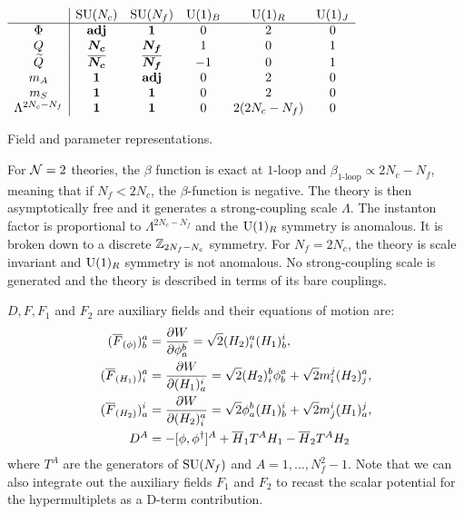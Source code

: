     \begin{table}[H]
        \centering
        $
        \begin{array}{c|ccccc}
            & \text{SU}(N_c) & \text{SU}(N_f) & \text{U}(1)_B & \text{U}(1)_R & \text{U}(1)_J \\ \hline
            \Phi & \textbf{adj} & \boldsymbol{1} & 0 & 2 & 0 \\
            Q & \boldsymbol{N_c} & \boldsymbol{N_f} & 1 & 0 & 1 \\
            \widetilde{Q} & \overline{\boldsymbol{N_c}} & \overline{\boldsymbol{N_f}} & -1 & 0 & 1 \\
            m_A & \boldsymbol{1} & \textbf{adj} & 0 & 2 & 0 \\
            m_S & \boldsymbol{1} & \boldsymbol{1} & 0 & 2 & 0 \\
            \Lambda^{2N_c-N_f} & \boldsymbol{1} & \boldsymbol{1} & 0 & 2(2N_c-N_f) & 0
        \end{array}
        $
        \caption{Field and parameter representations.}
        \label{table:fieldrepr}
    \end{table}

    For $\mathcal{N}=2$ theories, the $\beta$ function is exact at $1$-loop and $\beta_{1\text{-loop}}\propto 2N_c-N_f$, meaning that if $N_f<2N_c$, the $\beta$-function is negative. The theory is then asymptotically free and it generates a strong-coupling scale $\Lambda$. The instanton factor is proportional to $\Lambda^{2N_c-N_f}$ and the $\text{U}(1)_R$ symmetry is anomalous. It is broken down to a discrete $\mathbb{Z}_{2N_f-N_c}$ symmetry. For $N_f=2N_c$, the theory is scale invariant and $\text{U}(1)_R$ symmetry is not anomalous. No strong-coupling scale is generated and the theory is described in terms of its bare couplings.

    $D,F,F_1$ and $F_2$ are auxiliary fields and their equations of motion are:
    \begin{align}
        (\overline{F}_{(\phi)})^a_b &= \pdv{W}{\phi^b_a} = \sqrt{2}(H_2)^a_i (H_1)^i_b,\\
        (\overline{F}_{(H_1)})^a_i &= \pdv{W}{(H_{1})^i_a} = \sqrt{2}(H_2)^b_i\phi^a_b + \sqrt{2}m^j_i(H_2)^a_j,\\
        (\overline{F}_{(H_2)})^i_a &= \pdv{W}{(H_{2})^a_i} = \sqrt{2}\phi^b_a (H_1)^i_b + \sqrt{2}m^i_j(H_1)^j_a,\\
        D^A &= -[\phi,\phi^\dagger]^A + \overline{H}_1T^AH_1-\overline{H}_2T^AH_2
    \end{align}
    where $T^A$ are the generators of $\text{SU}(N_f)$ and $A=1,\dots,N^2_f-1$. Note that we can also integrate out the auxiliary fields $F_1$ and $F_2$ to recast the scalar potential for the hypermultiplets as a D-term contribution. 
    
